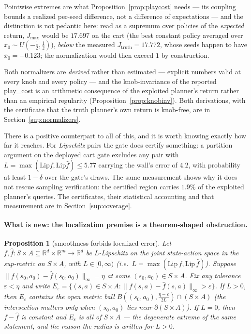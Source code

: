\documentclass[11pt]{article}
\newtheorem{proposition}{Proposition}
\theoremstyle{definition}
\theoremstyle{remark}
\begin{document}
Pointwise extremes are what Proposition~\ref{prop:playcost} needs --- its coupling bounds a realized per-seed difference, not a difference of expectations --- and the distinction is not pedantic here: read as a supremum over policies of the \emph{expected} return, $J_{\max}$ would be $17.697$ on the cart (the best constant policy averaged over $x_0 \sim U(-\tfrac12,\tfrac12)$), \emph{below} the measured $J_{\mathrm{truth}} = 17.772$, whose seeds happen to have $\bar x_0 = -0.123$; the normalization would then exceed $1$ by construction.

Both normalizers are \emph{derived} rather than estimated --- explicit numbers valid at every knob and every policy --- and the knob-invariance of the reported play\_cost is an arithmetic consequence of the exploited planner's return rather than an empirical regularity (Proposition~\ref{prop:knobinv}). Both derivations, with the certificate that the truth planner's own return is knob-free, are in Section~\ref{sup:normalizers}.

There is a positive counterpart to all of this, and it is worth knowing exactly how far it reaches. For \emph{Lipschitz} pairs the gate does certify something: a partition argument on the deployed cart gate excludes any pair with $L = \max(\mathrm{Lip} f, \mathrm{Lip}\hat f) \leq 5.77$ carrying the wall's error of $4.2$, with probability at least $1-\delta$ over the gate's draws. The same measurement shows why it does not rescue sampling verification: the certified region carries $1.9\%$ of the exploited planner's queries. The certificates, their statistical accounting and that measurement are in Section~\ref{sup:coverage}.

\paragraph{What is new: the localization premise is a theorem-shaped obstruction.}

\begin{proposition}[smoothness forbids localized error]
\label{prop:lipschitz}
Let $f, \hat f : S \times A \subseteq \mathbb{R}^{d} \times \mathbb{R}^{m} \to \mathbb{R}^d$ be $L$-Lipschitz on the joint state-action space in the sup-metric on $S \times A$, with $L \in [0,\infty)$ (i.e.\ $L = \max(\mathrm{Lip}\, f, \mathrm{Lip}\, \hat f)$). Suppose $\|f(s_0,a_0) - \hat f(s_0,a_0)\|_\infty = \eta$ at some $(s_0,a_0) \in S \times A$. Fix any tolerance $\varepsilon < \eta$ and write $E_\varepsilon = \{(s,a) \in S \times A : \|f(s,a) - \hat f(s,a)\|_\infty > \varepsilon\}$. If $L > 0$, then $E_\varepsilon$ contains the open metric ball $B\!\left((s_0,a_0), \tfrac{\eta-\varepsilon}{2L}\right) \cap (S \times A)$ (the intersection matters only when $(s_0,a_0)$ lies near $\partial(S \times A)$). If $L = 0$, then $f - \hat f$ is constant and $E_\varepsilon$ is all of $S \times A$ --- the degenerate extreme of the same statement, and the reason the radius is written for $L > 0$.
\end{proposition}
\end{document}

